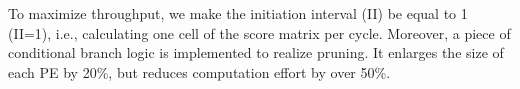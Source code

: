 To maximize throughput, we make the initiation interval (II) be equal to 1 (II=1), i.e., calculating one cell of the score matrix per cycle. 
Moreover, a piece of conditional branch logic is implemented to realize pruning. 
It enlarges the size of each PE by 20\%, but reduces computation effort by over 50\%.  
